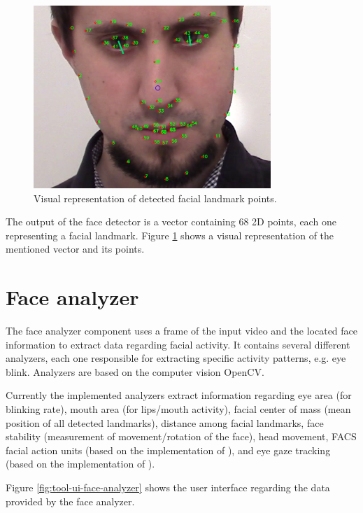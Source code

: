 \begin{figure}[h]
    \centering
    \includegraphics[width=0.8\textwidth]{figures/tool-ui-face-detector.png}
    \caption{Visual representation of detected facial landmark points.}
    \label{fig:tool-ui-face-detector}
\end{figure}

The output of the face detector is a vector containing 68 2D points, each one representing a facial landmark. Figure \ref{fig:tool-ui-face-detector} shows a visual representation of the mentioned vector and its points.

\section{Face analyzer}

The face analyzer component uses a frame of the input video and the located face information to extract data regarding facial activity. It contains several different analyzers, each one responsible for extracting specific activity patterns, e.g. eye blink. Analyzers are based on the computer vision OpenCV.

Currently the implemented analyzers extract information regarding eye area (for blinking rate), mouth area (for lips/mouth activity), facial center of mass (mean position of all detected landmarks), distance among facial landmarks, face stability (measurement of movement/rotation of the face), head movement, FACS facial action units (based on the implementation of \textcite{baltruvsaitis2015cross}), and eye gaze tracking (based on the implementation of \textcite{wood2015rendering}).

Figure \ref{fig:tool-ui-face-analyzer} shows the user interface regarding the data provided by the face analyzer.

